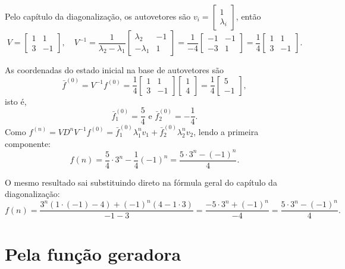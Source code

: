 Pelo capítulo da diagonalização, os autovetores são $v_i = \begin{bmatrix} 1 \\ \lambda_i \end{bmatrix}$, então
\[
  V =
  \begin{bmatrix}
    1 & 1 \\
    3 & -1
  \end{bmatrix},
  \quad
  V^{-1} = \dfrac{1}{\lambda_2 - \lambda_1}
  \begin{bmatrix}
    \lambda_2 & -1 \\
    -\lambda_1 & 1
  \end{bmatrix}
  = \dfrac{1}{-4}
  \begin{bmatrix}
    -1 & -1 \\
    -3 & 1
  \end{bmatrix}
  = \dfrac{1}{4}
  \begin{bmatrix}
    1 & 1 \\
    3 & -1
  \end{bmatrix}.
\]

As coordenadas do estado inicial na base de autovetores são
\[
  \bar{f}^{(0)} = V^{-1} f^{(0)}
  = \dfrac{1}{4}
  \begin{bmatrix}
    1 & 1 \\
    3 & -1
  \end{bmatrix}
  \begin{bmatrix}
    1 \\
    4
  \end{bmatrix}
  = \dfrac{1}{4}
  \begin{bmatrix}
    5 \\
    -1
  \end{bmatrix},
\]
isto é,
\[
  \bar{f}^{(0)}_1 = \dfrac{5}{4} \,\, \text{e} \,\, \bar{f}^{(0)}_2 = -\dfrac{1}{4}.
\]
Como $f^{(n)} = V D^n V^{-1} f^{(0)} = \bar{f}^{(0)}_1 \lambda_1^n v_1 + \bar{f}^{(0)}_2 \lambda_2^n v_2$, lendo a primeira componente:
\[
  f(n) = \dfrac{5}{4} \cdot 3^n - \dfrac{1}{4} (-1)^n = \dfrac{5 \cdot 3^n - (-1)^n}{4}.
\]

O mesmo resultado sai substituindo direto na fórmula geral do capítulo da diagonalização:
\[
  f(n) = \dfrac{3^n (1 \cdot (-1) - 4) + (-1)^n (4 - 1 \cdot 3)}{-1 - 3} = \dfrac{-5 \cdot 3^n + (-1)^n}{-4} = \dfrac{5 \cdot 3^n - (-1)^n}{4}.
\]

\section{Pela função geradora}


